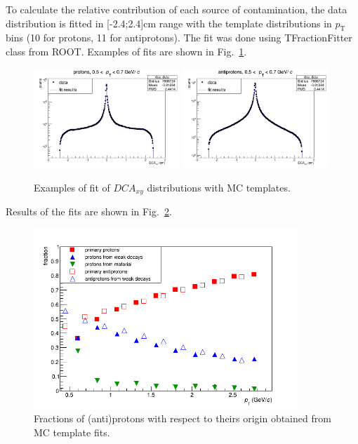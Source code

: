To calculate the relative contribution of each source of contamination, the data distribution is fitted in [-2.4;2.4]cm range with the template distributions in $p_{\mathrm T}$ bins (10 for protons, 11 for antiprotons). The fit was done using TFractionFitter class from ROOT. Examples of fits are shown in Fig.~\ref{fittemplate}.
 \begin{figure}%
   \centering
   \includegraphics[width=0.49\textwidth]{dcafitPP}
   \includegraphics[width=0.49\textwidth]{dcafitAPAP}
   \caption{Examples of fit of $DCA_{xy}$  distributions with MC templates.}
   \label{fittemplate}
 \end{figure}

Results of the fits are shown in Fig.~\ref{fractions}.
 \begin{figure}%
   \centering
   \includegraphics[width=0.89\textwidth]{fractions}
   \caption{Fractions of (anti)protons with respect to theirs origin obtained from MC template fits.}
   \label{fractions}
 \end{figure}



